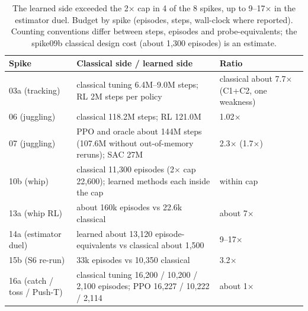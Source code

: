 \begin{table}[htbp]
\centering
\caption{The learned side exceeded the 2$\times$ cap in 4 of the 8 spikes, up to 9--17$\times$ in the estimator duel. Budget by spike (episodes, steps, wall-clock where reported). Counting conventions differ between steps, episodes and probe-equivalents; the spike09b classical design cost (about 1{,}300 episodes) is an estimate.}
\label{tab:budget}
\begin{tabular}{@{}p{2.2cm}p{7.3cm}p{3.7cm}@{}}
\toprule
Spike & Classical side / learned side & Ratio \\ \midrule
03a (tracking) & classical tuning 6.4M--9.0M steps; RL 2M steps per policy & classical about 7.7$\times$ (C1+C2, one weakness) \\
06 (juggling) & classical 118.2M steps; RL 121.0M & 1.02$\times$ \\
07 (juggling) & PPO and oracle about 144M steps (107.6M without out-of-memory reruns); SAC 27M & 2.3$\times$ (1.7$\times$) \\
10b (whip) & classical 11{,}300 episodes (2$\times$ cap 22{,}600); learned methods each inside the cap & within cap \\
13a (whip RL) & about 160k episodes vs 22.6k classical & about 7$\times$ \\
14a (estimator duel) & learned about 13{,}120 episode-equivalents vs classical about 1{,}500 & 9--17$\times$ \\
15b (S6 re-run) & 33k episodes vs 10{,}350 classical & 3.2$\times$ \\
16a (catch / toss / Push-T) & classical tuning 16{,}200 / 10{,}200 / 2{,}100 episodes; PPO 16{,}227 / 10{,}222 / 2{,}114 & about 1$\times$ \\
\bottomrule
\end{tabular}
\end{table}

